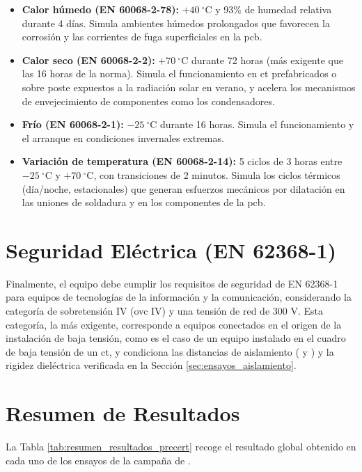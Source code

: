 \begin{itemize}
    \item \textbf{Calor húmedo (EN 60068-2-78):} $+40\ ^\circ\text{C}$ y $93\%$ de humedad relativa durante 4 días. Simula ambientes húmedos prolongados que favorecen la corrosión y las corrientes de fuga superficiales en la \gls{pcb}.
    \item \textbf{Calor seco (EN 60068-2-2):} $+70\ ^\circ\text{C}$ durante 72 horas (más exigente que las 16 horas de la norma). Simula el funcionamiento en \gls{ct} prefabricados o sobre poste expuestos a la radiación solar en verano, y acelera los mecanismos de envejecimiento de componentes como los condensadores.
    \item \textbf{Frío (EN 60068-2-1):} $-25\ ^\circ\text{C}$ durante 16 horas. Simula el funcionamiento y el arranque en condiciones invernales extremas.
    \item \textbf{Variación de temperatura (EN 60068-2-14):} 5 ciclos de 3 horas entre $-25\ ^\circ\text{C}$ y $+70\ ^\circ\text{C}$, con transiciones de 2 minutos. Simula los ciclos térmicos (día/noche, estacionales) que generan esfuerzos mecánicos por dilatación en las uniones de soldadura y en los componentes de la \gls{pcb}.
\end{itemize}

\section{Seguridad Eléctrica (EN 62368-1)}
\label{sec:ensayos_seguridad}

Finalmente, el equipo debe cumplir los requisitos de seguridad de EN 62368-1 para equipos de tecnologías de la información y la comunicación, considerando la categoría de sobretensión IV (\gls{ovc} IV) y una tensión de red de 300 V. Esta categoría, la más exigente, corresponde a equipos conectados en el origen de la instalación de baja tensión, como es el caso de un equipo instalado en el cuadro de baja tensión de un \gls{ct}, y condiciona las distancias de aislamiento (\textit{} y \textit{}) y la rigidez dieléctrica verificada en la Sección \ref{sec:ensayos_aislamiento}.

\section{Resumen de Resultados}
\label{sec:resumen_resultados_precert}

La Tabla \ref{tab:resumen_resultados_precert} recoge el resultado global obtenido en cada uno de los ensayos de la campaña de .

